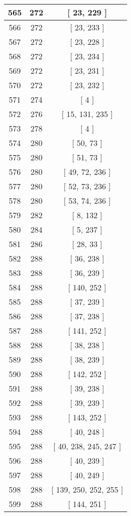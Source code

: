 \begin{center}
\begin{longtable}[H]{|| c c c ||}
\hline
565 & 272 & [ 23, 229 ] \\ 
\hline
566 & 272 & [ 23, 233 ] \\ 
\hline
567 & 272 & [ 23, 228 ] \\ 
\hline
568 & 272 & [ 23, 234 ] \\ 
\hline
569 & 272 & [ 23, 231 ] \\ 
\hline
570 & 272 & [ 23, 232 ] \\ 
\hline
571 & 274 & [ 4 ] \\ 
\hline
572 & 276 & [ 15, 131, 235 ] \\ 
\hline
573 & 278 & [ 4 ] \\ 
\hline
574 & 280 & [ 50, 73 ] \\ 
\hline
575 & 280 & [ 51, 73 ] \\ 
\hline
576 & 280 & [ 49, 72, 236 ] \\ 
\hline
577 & 280 & [ 52, 73, 236 ] \\ 
\hline
578 & 280 & [ 53, 74, 236 ] \\ 
\hline
579 & 282 & [ 8, 132 ] \\ 
\hline
580 & 284 & [ 5, 237 ] \\ 
\hline
581 & 286 & [ 28, 33 ] \\ 
\hline
582 & 288 & [ 36, 238 ] \\ 
\hline
583 & 288 & [ 36, 239 ] \\ 
\hline
584 & 288 & [ 140, 252 ] \\ 
\hline
585 & 288 & [ 37, 239 ] \\ 
\hline
586 & 288 & [ 37, 238 ] \\ 
\hline
587 & 288 & [ 141, 252 ] \\ 
\hline
588 & 288 & [ 38, 238 ] \\ 
\hline
589 & 288 & [ 38, 239 ] \\ 
\hline
590 & 288 & [ 142, 252 ] \\ 
\hline
591 & 288 & [ 39, 238 ] \\ 
\hline
592 & 288 & [ 39, 239 ] \\ 
\hline
593 & 288 & [ 143, 252 ] \\ 
\hline
594 & 288 & [ 40, 248 ] \\ 
\hline
595 & 288 & [ 40, 238, 245, 247 ] \\ 
\hline
596 & 288 & [ 40, 239 ] \\ 
\hline
597 & 288 & [ 40, 249 ] \\ 
\hline
598 & 288 & [ 139, 250, 252, 255 ] \\ 
\hline
599 & 288 & [ 144, 251 ] \\ 

\end{longtable}
\end{center}
